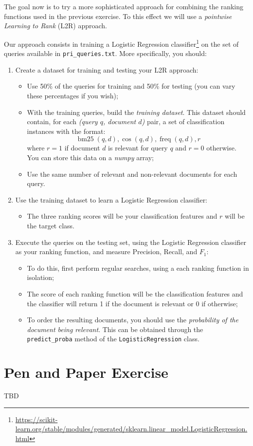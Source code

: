 \documentclass[12pt]{article}
\begin{document}
\section{}

The goal now is to try a more sophisticated approach for combining the ranking functions used in the previous exercise. To this effect we will use a \emph{pointwise Learning to Rank} (L2R) approach.

Our approach consists in training a Logistic Regression classifier\footnote{\url{https://scikit-learn.org/stable/modules/generated/sklearn.linear_model.LogisticRegression.html}} on the set of queries available in \texttt{pri\_queries.txt}. More specifically, you should:
\begin{enumerate}
\item Create a dataset for training and testing your L2R approach:
    \begin{itemize}
    \item Use 50\% of the queries for training and 50\% for testing (you can vary these percentages if you wish);
    \item With the training queries, build the \emph{training dataset}. This dataset should contain, for each \textit{(query $q$, document $d$)} pair, a set of classification instances with the format:
        \begin{displaymath}
            \operatorname{bm25}(q,d), \operatorname{cos}(q,d), \operatorname{freq}(q,d), r
        \end{displaymath}
        where $r = 1$ if document $d$ is relevant for query $q$ and $r=0$ otherwise. You can store this data on a \textit{numpy} array;
    \item Use the same number of relevant and non-relevant documents for each query.
    \end{itemize}
\item Use the training dataset to learn a Logistic Regression classifier:
    \begin{itemize}
    \item The three ranking scores will be your classification features and $r$ will be the target class.
    \end{itemize}
\item Execute the queries on the testing set, using the Logistic Regression classifier as your ranking function, and measure Precision, Recall, and $F_1$:
    \begin{itemize}
    \item To do this, first perform regular searches, using a each ranking function in isolation;
    \item The score of each ranking function will be the classification features and the classifier will return 1 if the document is relevant or 0 if otherwise;
    \item To order the resulting documents, you should use the \emph{probability of the document being relevant}. This can be obtained through the \texttt{predict\_proba} method of the \texttt{LogisticRegression} class.
    \end{itemize}
\end{enumerate}



\section{Pen and Paper Exercise}

TBD
\end{document}
